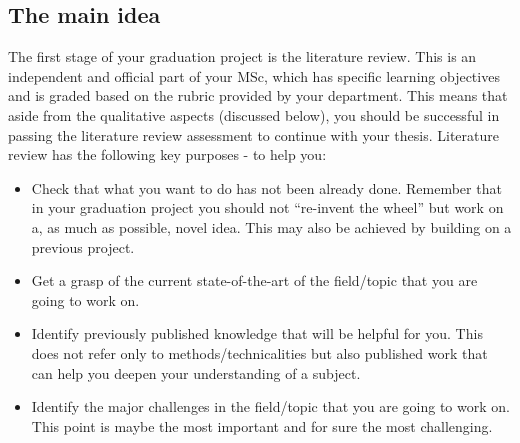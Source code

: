 \documentclass{article}
\begin{document}
\subsection{The main idea}
The first stage of your graduation project is the literature review. This is an independent and official part of your MSc, which has specific learning objectives and is graded based on the rubric provided by your department. This means that aside from the qualitative aspects (discussed below), you should be successful in passing the literature review assessment to continue with your thesis. Literature review has the following key purposes - to help you:
\begin{itemize}
\item Check that what you want to do has not been already done. Remember that in your graduation project you should not “re-invent the wheel” but work on a, as much as possible, novel idea. This may also be achieved by building on a previous project.
\item Get a grasp of the current state-of-the-art of the field/topic that you are going to work on.
\item Identify previously published knowledge that will be helpful for you. This does not refer only to methods/technicalities but also published work that can help you deepen your understanding of a subject.
\item Identify the major challenges in the field/topic that you are going to work on. This point is maybe the most important and for sure the most challenging. 
\end{itemize}
\end{document}
